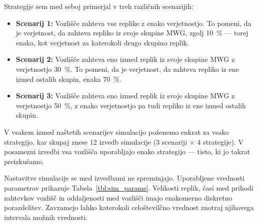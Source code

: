 \documentclass[a4paper, 12pt]{book}
\begin{document}
Strategije sem med seboj primerjal v treh različnih scenarijih:
\begin{itemize}
  \item \textbf{Scenarij 1:} Vozlišče zahteva vse replike z
    enako verjetnostjo. To pomeni, da je verjetnost, da zahteva repliko iz
    svoje skupine MWG, zgolj 10~\% --- torej enaka, kot verjetnost za
    katerokoli drugo skupino replik.

  \item \textbf{Scenarij 2:} Vozlišče zahteva eno izmed replik iz svoje
    skupine MWG z verjetnostjo 30~\%. To pomeni, da je verjetnost, da
    zahteva repliko iz ene izmed ostalih skupin, enaka 70~\%.

  \item \textbf{Scenarij 3:} Vozlišče zahteva eno izmed replik iz svoje
    skupine MWG z verjetnostjo 50~\%, z enako verjetnostjo pa tudi repliko
    iz ene izmed ostalih skupin.
\end{itemize}
V vsakem izmed naštetih scenarijev simulacijo poženemo enkrat za vsako
strategijo, kar skupaj znese 12 izvedb simulacije
(3 scenariji $\times$ 4 strategije). V posamezni izvedbi vsa vozlišča
uporabljajo enako strategijo --- tisto, ki jo takrat preizkušamo.

Nastavitve simulacije se med izvedbami ne spreminjajo. Uporabljene vrednosti
parametrov prikazuje Tabela~\ref{tbl:sim_params}.
Velikosti replik, časi med prihodi zahtevkov vozlišč in oddaljenosti med
vozlišči imajo enakomerno diskretno porazdelitev. Zavzamejo lahko katerokoli
celoštevilčno vrednost znotraj njihovega intervala možnih vrednosti.
\end{document}
